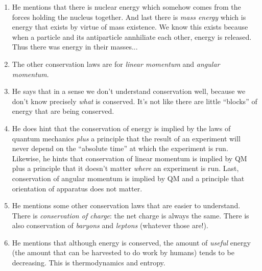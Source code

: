 \begin{enumerate}
  \item He mentions that there is nuclear energy which somehow comes
  from the forces holding the nucleus together. And last there is
  \emph{mass energy} which is energy that exists by virtue of mass
  existence. We know this exists because when a particle and its
  antiparticle annhiliate each other, energy is released. Thus there was
  energy in their masses...

  \item The other conservation laws are for \emph{linear momentum} and
  \emph{angular momentum}.

  \item He says that in a sense we don't understand conservation well,
  because we don't know precisely \emph{what} is conserved. It's not
  like there are little ``blocks'' of energy that are being conserved.

  \item He does hint that the conservation of energy is implied by the
  laws of quantum mechanics \emph{plus} a principle that the result of
  an experiment will never depend on the ``absolute time'' at which the
  experiment is run. Likewise, he hints that conservation of linear
  momentum is implied by QM plus a principle that it doesn't matter
  \emph{where} an experiment is run. Last, conservation of angular
  momentum is implied by QM and a principle that orientation of
  apparatus does not matter.

  \item He mentions some other conservation laws that are easier to
  understand. There is \emph{conservation of charge}: the net charge is
  always the same. There is also conservation of \emph{baryons} and
  \emph{leptons} (whatever those are!).

  \item He mentions that although energy is conserved, the amount of
  \emph{useful} energy (the amount that can be harvested to do work by
  humans) tends to be decreasing. This is thermodynamics and entropy.

\end{enumerate}


